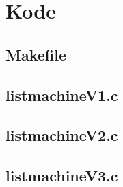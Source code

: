 \chapter{Kode}
\section{Makefile}
\label{Code_make}

\clearpage
\section{listmachineV1.c}
\label{Code_V1}

\clearpage
\section{listmachineV2.c}
\label{Code_V2}

\clearpage
\section{listmachineV3.c}
\label{Code_V2}

\clearpage